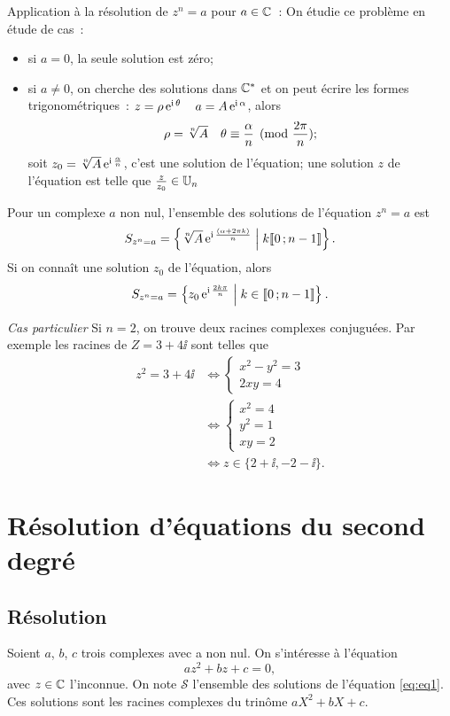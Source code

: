 Application à la résolution de \(z^n=a\) pour \(a \in \mathbb{C}\)~: On étudie ce problème en étude de cas~:
\begin{itemize}
\item si \(a=0\), la seule solution est zéro;
\item si \(a \neq 0\), on cherche des solutions dans \(\mathbb{C}^*\) et on peut écrire les formes trigonométriques~: \(z=\rho \operatorname{e}^{\operatorname{i} \theta} \quad a = A \operatorname{e}^{\operatorname{i} \alpha}\), alors
  \begin{equation}
    \rho = \sqrt[n]{A} \quad \theta \equiv \frac{\alpha}{n} \pmod {\frac{2\pi}{n}};
  \end{equation}
  soit \(z_0=\sqrt[n]{A}  \operatorname{e}^{\operatorname{i} \frac{\alpha}{n}}\), c'est une solution de l'équation; une solution \(z\) de l'équation est telle que \(\frac{z}{z_0} \in \mathbb{U}_n\)
\end{itemize}
%
\begin{prop}
  Pour un complexe \(a\) non nul, l'ensemble des solutions de l'équation \(z^n=a\) est
  \begin{equation}
    S_{z^n=a}=\left\{\sqrt[n]{A} \operatorname{e}^{\operatorname{i} \frac{(\alpha + 2\pi k)}{n}}\mathrel{}\middle|\mathrel{}k \mathopen{\llbracket}0\mathclose{}\mathpunct{};n-1\mathclose{\rrbracket}\right\}.
  \end{equation}
  Si on connaît une solution \(z_0\) de l'équation, alors
  \begin{equation}
    S_{z^n=a}=\left\{z_0 \operatorname{e}^{\operatorname{i} \frac{2 k \pi}{n}}\mathrel{}\middle|\mathrel{}k \in \mathopen{\llbracket}0\mathclose{}\mathpunct{};n-1\mathclose{\rrbracket}\right\}.
  \end{equation}
\end{prop}
\emph{Cas particulier}
Si \(n=2\), on trouve deux racines complexes conjuguées. Par exemple les racines de \(Z=3+4\ii\) sont telles que
\begin{align}
  z^2=3+4\ii & \iff  \begin{cases} x^2-y^2=3 \\ 2xy=4 \end{cases} \\
  & \iff \begin{cases} x^2=4 \\ y^2=1 \\ xy=2 \end{cases} \\
  & \iff z \in \{2+\ii, -2-\ii\}.
\end{align}
%
\section{Résolution d'équations du second degré}
\label{sec:resolutionequationseconddegre}
\subsection{Résolution}
\label{subsec:resolution}
Soient \(a\), \(b\), \(c\) trois complexes avec a non nul. On s'intéresse à l'équation
\begin{equation}
  \label{eq:eq1}
  az^2+bz+c=0,
\end{equation}
avec \(z \in \mathbb{C}\) l'inconnue. On note \(\mathcal{S}\) l'ensemble des solutions de l'équation \eqref{eq:eq1}. Ces solutions sont les racines complexes du trinôme \(aX^2+bX+c\).

